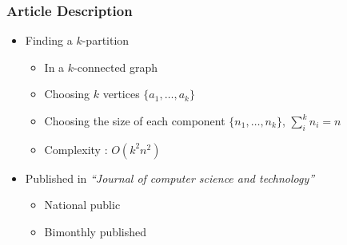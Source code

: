 \begin{frame}
  \frametitle{Article Description}
  \begin{itemize}
  \item Finding a $k$-partition
    \begin{itemize}
    \item In a $k$-connected graph
    \item Choosing $k$ vertices $\{a_1, \dots , a_k\}$
    \item Choosing the size of each component $\{n_1, \dots ,n_k\}$,
      $\sum\limits_{i}^k{n_i} = n$
    \item Complexity : $O(k^2 n^2)$
    \end{itemize}
  \item Published in {\em ``Journal of computer science and technology''}
    \begin{itemize}
    \item National public
    \item Bimonthly published
    \end{itemize}
  \end{itemize}
\end{frame}


